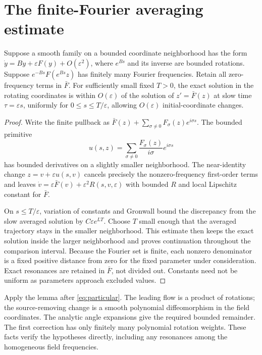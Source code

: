 \documentclass[11pt,a4paper]{article}
\begin{document}
\section{The finite-Fourier averaging estimate}
\begin{lemma}\label{lem:average}
Suppose a smooth family on a bounded coordinate neighborhood has the form
$\dot y=By+\varepsilon F(y)+O(\varepsilon^2)$, where $e^{Bs}$ and its inverse are bounded rotations. Suppose $e^{-Bs}F(e^{Bs}z)$ has finitely many Fourier frequencies. Retain all zero-frequency terms in $\bar F$. For sufficiently small fixed $T>0$, the exact solution in the rotating coordinates is within $O(\varepsilon)$ of the solution of $z'=\bar F(z)$ at slow time $\tau=\varepsilon s$, uniformly for $0\leq s\leq T/\varepsilon$, allowing $O(\varepsilon)$ initial-coordinate changes.
\end{lemma}
\begin{proof}
Write the finite pullback as $\bar F(z)+\sum_{\sigma\ne0}F_\sigma(z)e^{i\sigma s}$. The bounded primitive
\[
u(s,z)=\sum_{\sigma\ne0}\frac{F_\sigma(z)}{i\sigma}e^{i\sigma s}
\]
has bounded derivatives on a slightly smaller neighborhood. The near-identity change $z=v+\varepsilon u(s,v)$ cancels precisely the nonzero-frequency first-order terms and leaves
$\dot v=\varepsilon\bar F(v)+\varepsilon^2R(s,v,\varepsilon)$ with bounded $R$ and local Lipschitz constant for $\bar F$.

On $s\leq T/\varepsilon$, variation of constants and Gronwall bound the discrepancy from the slow averaged solution by $C\varepsilon e^{LT}$. Choose $T$ small enough that the averaged trajectory stays in the smaller neighborhood. This estimate then keeps the exact solution inside the larger neighborhood and proves continuation throughout the comparison interval. Because the Fourier set is finite, each nonzero denominator is a fixed positive distance from zero for the fixed parameter under consideration. Exact resonances are retained in $\bar F$, not divided out. Constants need not be uniform as parameters approach excluded values.
\end{proof}
Apply the lemma after \eqref{eq:particular}. The leading flow is a product of rotations; the source-removing change is a smooth polynomial diffeomorphism in the field coordinates. The analytic angle expansions give the required bounded remainder. The first correction has only finitely many polynomial rotation weights. These facts verify the hypotheses directly, including any resonances among the homogeneous field frequencies.
\end{document}

